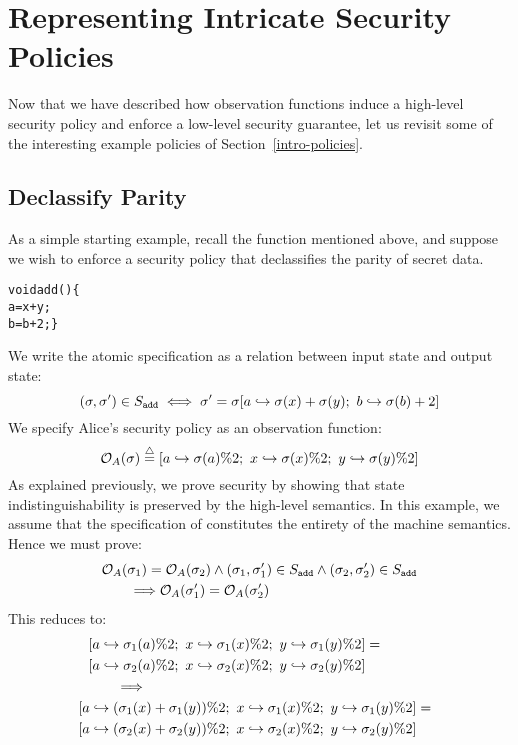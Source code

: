 \section{Representing Intricate Security Policies}
\label{policies}

Now that we have described how observation functions induce a high-level
security policy and enforce a low-level security guarantee, let us
revisit some of the interesting example policies of Section~\ref{intro-policies}.

\subsection{Declassify Parity}

As a simple starting example, recall the  function
mentioned above, and suppose we wish to enforce a security policy that 
declassifies the parity of secret data.
{\small\begin{alltt}
  void add() \{
      a = x + y;
      b = b + 2; \}
\end{alltt}}%
\noindent{}We write the atomic specification as a relation
between input state and output state:
{\small\[(\sigma,\sigma') \in S_{\text{\tt{add}}} \iff
\sigma' = 
\sigma[a \hookrightarrow \sigma(x) + \sigma(y); \,\,
       b \hookrightarrow \sigma(b) + 2]\]}%
\noindent{}We specify Alice's security policy as an observation function:
{\small\[\mathcal{O}_{A}(\sigma) \stackrel{\triangle}{=} 
[a \hookrightarrow \sigma(a)\%2; \,\, x \hookrightarrow \sigma(x)\%2; 
\,\, y \hookrightarrow \sigma(y)\%2]\]}%
\noindent{}As explained previously,
we prove security by showing that state indistinguishability is preserved 
by the high-level semantics. In this example, we assume that the specification of
 constitutes the entirety of the machine semantics. Hence we
must prove:
{\small\begin{align*}
& \mathcal{O}_{A}(\sigma_1) = \mathcal{O}_{A}(\sigma_2) \land
(\sigma_1,\sigma_1') \in S_{\text{\tt{add}}} \land (\sigma_2,\sigma_2') \in S_{\text{\tt{add}}} \\
& \qquad \Longrightarrow
\mathcal{O}_{A}(\sigma_1') = \mathcal{O}_{A}(\sigma_2')
\end{align*}}%
\noindent{}This reduces to:
{\small\begin{align*}
& [a \hookrightarrow \sigma_1(a)\%2; \,\, x \hookrightarrow \sigma_1(x)\%2; 
\,\, y \hookrightarrow \sigma_1(y)\%2] = \\
& [a \hookrightarrow \sigma_2(a)\%2; \,\, x \hookrightarrow \sigma_2(x)\%2; 
\,\, y \hookrightarrow \sigma_2(y)\%2] \\
& \qquad \Longrightarrow \\
& \hspace*{-0.1in}
[a \hookrightarrow (\sigma_1(x) + \sigma_1(y))\%2; \,\, x \hookrightarrow \sigma_1(x)\%2; 
\,\, y \hookrightarrow \sigma_1(y)\%2] = \\
& \hspace*{-0.1in}
[a \hookrightarrow (\sigma_2(x) + \sigma_2(y))\%2; \,\, x \hookrightarrow \sigma_2(x)\%2; 
\,\, y \hookrightarrow \sigma_2(y)\%2]
\end{align*}}%
